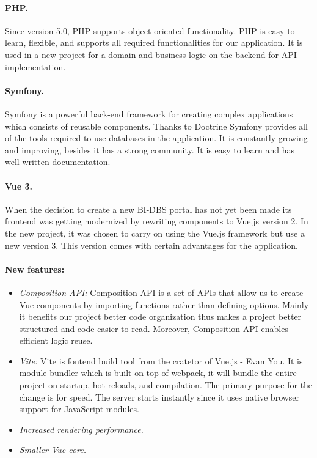 \paragraph*{PHP.} Since version 5.0, PHP supports object-oriented functionality\cite{php-oop}. PHP is easy to learn, flexible, and supports all required functionalities for our application. It is used in a new project for a domain and business logic on the backend for API implementation.

\paragraph*{Symfony.} Symfony is a powerful back-end framework for creating complex applications which consists of reusable components.\cite{symphony-doc} Thanks to Doctrine Symfony provides all of the tools required to use databases in the application. It is constantly growing and improving, besides it has a strong community. It is easy to learn and has well-written documentation.


\paragraph*{Vue 3.} When the decision to create a new BI-DBS portal has not yet been made its frontend was getting modernized by rewriting components to Vue.js version 2. In the new project, it was chosen to carry on using the Vue.js framework but use a new version 3. This version comes with certain advantages for the application.\cite{vue3-updates}

\paragraph*{New features:}
\begin{itemize}
  \item \emph{Composition API:} Composition API is a set of APIs that allow us to create Vue components by importing functions rather than defining options. Mainly it benefits our project better code organization thus makes a project better structured and code easier to read. Moreover, Composition API enables efficient logic reuse.\cite{compositionapi-doc}
  
   \item \emph{Vite:} Vite is fontend build tool from the cratetor of Vue.js - Evan You. It is module bundler which is built on top of webpack, it will bundle the entire project on startup, hot reloads, and compilation. The primary purpose for the change is for speed. The server starts instantly since it uses native browser support for JavaScript modules.\cite{vite-doc}

   \item \emph{Increased rendering performance.}

    \item \emph{Smaller Vue core.}


\end{itemize}


